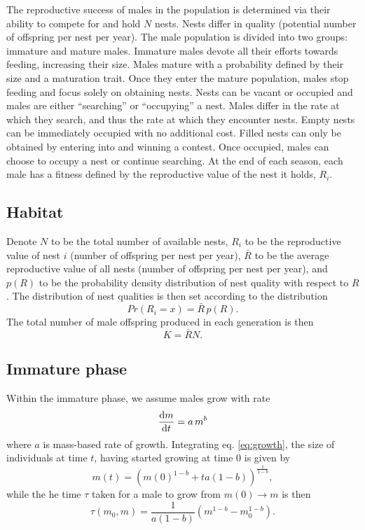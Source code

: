 \documentclass[a4paper,11pt]{article}
\begin{document}
The reproductive success of males in the population is determined via their ability to compete for and hold $N$ nests. Nests differ in quality (potential number of offspring per nest per year). The male population is divided into two groups: immature and mature males. Immature males devote all their efforts towards feeding, increasing their size. Males mature with a probability defined by their size and a maturation trait. Once they enter the mature population, males stop feeding and focus solely on obtaining nests. Nests can be vacant or occupied and males are either ``searching'' or ``occupying'' a nest. Males differ in the rate at which they search, and thus the rate at which they encounter nests. Empty nests can be immediately occupied with no additional cost. Filled nests can only be obtained by entering into and winning a contest. Once occupied, males can choose to occupy a nest or continue searching. At the end of each season, each male has a fitness defined by the reproductive value of the nest it holds, $R_i$.

\subsection{Habitat}

Denote $N$ to be the total number of available nests, $R_i$ to be the reproductive value of nest $i$ (number of offspring per nest per year), $\bar{R}$ to be the average reproductive value of all nests (number of offspring per nest per year), and $p(R)$ to be the probability density distribution of nest quality with respect to $R$. The distribution of nest qualities is then set according to the distribution
\begin{equation} \label{eq:pdf_R}
Pr(R_i = x) =\bar{R} \, p(R).
\end{equation}
The total number of male offspring produced in each generation is then
\begin{equation} \label{eq:pdf_R}
K = \bar{R} N.
\end{equation}

\subsection{Immature phase}

Within the immature phase, we assume males grow with rate
\begin{equation} \label{eq:growth}
\frac{{\rm d} m}{{\rm d} t} = a \, m^ b
\end{equation}
where $a$ is mass-based rate of growth. Integrating eq. \ref{eq:growth}, the size of individuals at time $t$, having started growing at time $0$ is given by
\begin{equation} \label{eq:growth}
m(t) = \left(m(0)^{1-b} + t a(1-b)\right)^{\frac1{1-b}},
\end{equation}
while the he time $\tau$ taken for a male to grow from $m(0) \rightarrow m$ is then
\begin{equation} \label{eq:tau}
\tau(m_0, m) = \frac1{a(1-b)}\left(m ^{1-b} - m_0 ^{1-b}\right).
\end{equation}
\end{document}
